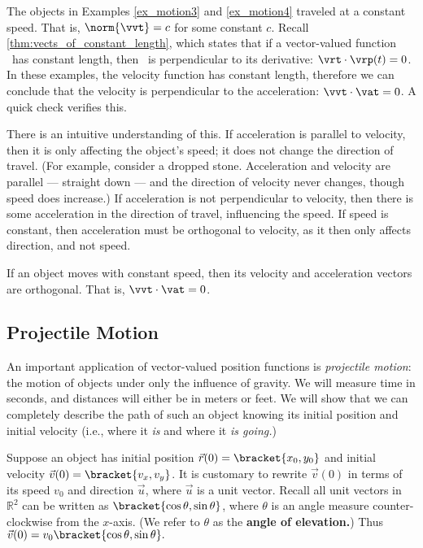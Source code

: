 The objects in Examples \ref{ex_motion3} and \ref{ex_motion4} traveled at a constant speed. That is, $\norm{\vvt} = c$ for some constant $c$. Recall \autoref{thm:vects_of_constant_length}, which states that if a vector-valued function \vrt\ has constant length, then \vrt\ is perpendicular to its derivative: $\vrt\cdot\vrp(t) = 0$. In these examples, the velocity function has constant length, therefore we can conclude that the velocity is perpendicular to the acceleration: $\vvt\cdot\vat = 0$. A quick check verifies this.

There is an intuitive understanding of this. If acceleration is parallel to velocity, then it is only affecting the object's speed; it does not change the direction of travel. (For example, consider a dropped stone. Acceleration and velocity are parallel --- straight down --- and the direction of velocity never changes, though speed does increase.) If acceleration is not perpendicular to velocity, then there is some acceleration in the direction of travel, influencing the speed. If speed is constant, then acceleration must be orthogonal to velocity, as it then only affects direction, and not speed.

\begin{keyidea}\label{idea:constant_speed}
If an object moves with constant speed, then its velocity and acceleration vectors are orthogonal. That is, $\vvt\cdot\vat=0$.
\end{keyidea}


\subsection{Projectile Motion}

An important application of vector-valued position functions is \emph{projectile motion}: the motion of objects under only the influence of gravity. We will measure time in seconds, and distances will either be in meters or feet. We will show that we can completely describe the path of such an object knowing its initial position and initial velocity (i.e., where it \emph{is} and where it \emph{is going.})

Suppose an object has initial position $\vec r(0) =\bracket{x_0,y_0}$ and initial velocity $\vec v(0) =\bracket{v_x,v_y}$. It is customary to rewrite $\vec v(0)$ in terms of its speed $v_0$ and direction $\vec u$, where $\vec u$ is a unit vector. Recall all unit vectors in $\mathbb{R}^2$ can be written as $\bracket{\cos \theta,\sin \theta}$, where $\theta$ is an angle measure counter-clockwise from the $x$-axis. (We refer to $\theta$ as the \textbf{angle of elevation.}) Thus $\vec v(0) = v_0\bracket{\cos \theta,\sin \theta}.$ 

